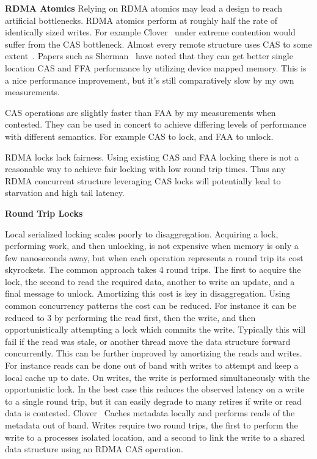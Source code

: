\textbf{RDMA Atomics} Relying on RDMA atomics may lead a design to reach
artificial bottlenecks. RDMA atomics perform at roughly half the rate of
identically sized writes. For example Clover~\cite{clover} under extreme
contention would suffer from the CAS bottleneck. Almost every remote structure
uses CAS to some extent~. Papers such as
Sherman~\cite{sherman} have noted that they can get better single location CAS
and FFA performance by utilizing device mapped memory. This is a nice
performance improvement, but it's still comparatively slow by my own
measurements.

CAS operations are slightly faster than FAA by my measurements when contested.
They can be used in concert to achieve differing levels of performance with
different semantics. For example CAS to lock, and FAA to unlock.

RDMA locks lack fairness. Using existing CAS and FAA locking there is not a
reasonable way to achieve fair locking with low round trip times. Thus any RDMA
concurrent structure leveraging CAS locks will potentially lead to starvation
and high tail latency.

\textbf{Round Trip Locks}

Local serialized locking scales poorly to disaggregation. Acquiring a lock,
performing work, and then unlocking, is not expensive when memory is only a few
nanoseconds away, but when each operation represents a round trip its cost
skyrockets. The common approach takes 4 round trips. The first to acquire the
lock, the second to read the required data, another to write an update, and a
final message to unlock. Amortizing this cost is key in disaggregation. Using
common concurrency patterns the cost can be reduced. For instance it can be
reduced to 3 by performing the read first, then the write, and then
opportunistically attempting a lock which commits the write. Typically this will
fail if the read was stale, or another thread move the data structure forward
concurrently. This can be further improved by amortizing the reads and writes.
For instance reads can be done out of band with writes to attempt and keep a
local cache up to date. On writes, the write is performed simultaneously with
the opportunistic lock. In the best case this reduces the observed latency on a
write to a single round trip, but it can easily degrade to many retires if write
or read data is contested. Clover~\cite{clover} Caches metadata locally and
performs reads of the metadata out of band. Writes require two round trips, the
first to perform the write to a processes isolated location, and a second to
link the write to a shared data structure using an RDMA CAS operation.

